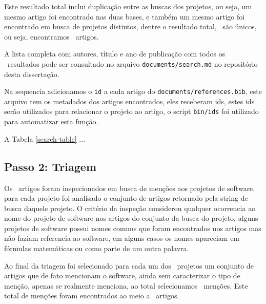 Este resultado total inclui duplicação entre as buscas dos projetos, ou seja,
um mesmo artigo foi encontrado nas duas bases, e também um mesmo artigo foi
encontrado em busca de projetos distintos, dentre o resultado total,
\SearchUniqueCount \ são únicos, ou seja, encontramos \SearchUniqueCount \ artigos.

A lista completa com autores, título e ano de publicação com todos os
\SearchUniqueCount \ resultados pode ser consultado no arquivo
\texttt{documents/search.md} no repositório desta dissertação.


Na sequencia adicionamos o \texttt{id} a cada artigo do
\texttt{documents/references.bib}, este arquivo tem os metadados dos artigos
encontrados, eles receberam ids, estes ids serão
utilizados para relacionar o projeto ao artigo, o script \texttt{bin/ids}
foi utilizado para automatizar esta função.

A Tabela \ref{search-table} ...




\subsection{Passo 2: Triagem}

Os \SearchUniqueCount \ artigos foram inspecionados em busca de menções aos
projetos de software, para cada projeto foi analisado o conjunto de artigos
retornado pela string de busca daquele projeto. O critério da inspeção considerou qualquer ocorrencia ao nome do projeto de
software nos artigos do conjunto da busca do projeto, alguns projetos de
software possui nomes comuns que foram encontrados nos artigos mas não faziam
referencia ao software, em alguns casos os nomes apareciam em fórmulas
matemáticas ou como parte de um outra palavra.

Ao final da triagem foi selecionado para cada um dos \SoftwareCount \ projetos um conjunto de artigos
que de fato mencionam o software, ainda sem caracterizar o tipo de menção,
apenas se realmente menciona, ao total selecionamos \ScreeningCount \ menções.
Este total de menções foram encontrados ao meio a \ScreeningUniqueCount \
artigos.

